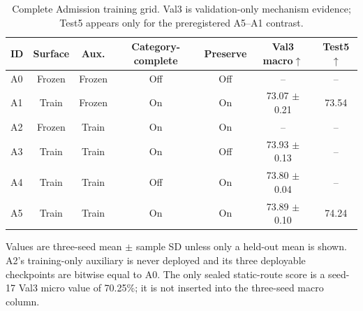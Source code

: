 \begin{table}[t]
\centering
\caption{Complete Admission training grid. Val3 is validation-only mechanism evidence; Test5 appears only for the preregistered A5--A1 contrast.}
\label{tab:supp-admission-grid}
\label{tab:supp-training}
\scriptsize
\setlength{\tabcolsep}{3pt}
\begin{tabular}{lcccccc}\toprule
ID & Surface & Aux. & Category-complete & Preserve & Val3 macro$\uparrow$ & Test5$\uparrow$\\\midrule
A0 & Frozen & Frozen & Off & Off & -- & -- \\
A1 & Train & Frozen & On & On & 73.07 $\pm$ 0.21 & 73.54 \\
A2 & Frozen & Train & On & On & -- & -- \\
A3 & Train & Train & On & Off & 73.93 $\pm$ 0.13 & -- \\
A4 & Train & Train & Off & On & 73.80 $\pm$ 0.04 & -- \\
A5 & Train & Train & On & On & 73.89 $\pm$ 0.10 & 74.24 \\
\bottomrule\end{tabular}
\parbox{0.97\textwidth}{\scriptsize Values are three-seed mean $\pm$ sample SD unless only a held-out mean is shown. A2's training-only auxiliary is never deployed and its three deployable checkpoints are bitwise equal to A0. The only sealed static-route score is a seed-17 Val3 micro value of 70.25\%; it is not inserted into the three-seed macro column.}

\end{table}

